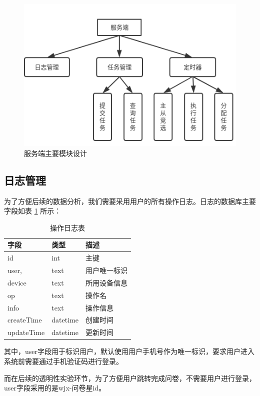 \begin{figure}[ht]
    \centering
    \includegraphics[width=12cm]{images/server.png}
    \caption{服务端主要模块设计}
    \label{fig:server}
\end{figure}


\subsection{日志管理}
为了方便后续的数据分析，我们需要采用用户的所有操作日志。日志的数据库主要字段如表 \ref{tab:op_log} 所示：

\begin{table}[]
    \centering
    \begin{tabular}{lll}
        \toprule
        字段 & 类型 & 描述 \\ 
        \midrule
        id & int & 主键 \\
        user, & text & 用户唯一标识 \\ 
        device & text & 所用设备信息 \\
        op & text & 操作名 \\
        info & text & 操作信息 \\
        createTime & datetime & 创建时间 \\
        updateTime & datetime & 更新时间\\
        \bottomrule
    \end{tabular}
    \caption{操作日志表}
    \label{tab:op_log}
\end{table}


其中，user字段用于标识用户，默认使用用户手机号作为唯一标识，要求用户进入系统前需要通过手机验证码进行登录。

而在后续的透明性实验环节，为了方便用户跳转完成问卷，不需要用户进行登录，user字段采用的是wjx-问卷星id。

